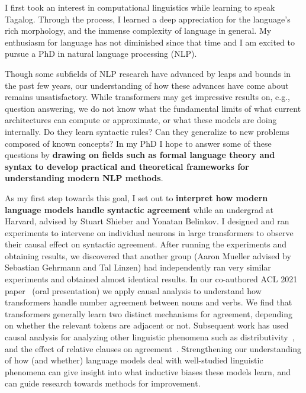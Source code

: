 \documentclass[12pt]{article}
\begin{document}
I first took an interest in computational linguistics 
while learning to speak Tagalog. 
Through the process, I learned a deep appreciation for the language's rich morphology,
and the immense complexity of language in general.
My enthusiasm for language has not diminished since that time
and I am excited to pursue a PhD in natural language processing (NLP).

Though some subfields of NLP research 
have advanced by leaps and bounds in the past few years,
our understanding of how these advances 
have come about remains unsatisfactory.
While transformers may get impressive results on, e.g., question answering,
we do not know what the fundamental limits 
of what current architectures can compute or approximate,
or what these models are doing internally.
Do they learn syntactic rules? 
Can they generalize to new problems composed of known concepts?
In my PhD I hope to answer some of these questions
by \textbf{drawing on fields such as formal language theory and syntax
to develop practical and theoretical frameworks 
for understanding modern NLP methods}.

As my first step towards this goal, 
I set out to \textbf{interpret how modern language models handle syntactic agreement}
while an undergrad at Harvard, advised by Stuart Shieber and Yonatan Belinkov.
I designed and ran experiments
to intervene on individual neurons in large transformers 
to observe their causal effect on syntactic agreement.
After running the experiments and obtaining results,
we discovered that another group 
(Aaron Mueller advised by Sebastian Gehrmann and Tal Linzen)
had independently ran very similar experiments and obtained almost identical results.
In our co-authored ACL 2021 paper~\cite{Finlayson2021CausalAO}
(oral presentation)
we apply causal analysis to understand 
how transformers handle number agreement between nouns and verbs. 
We find that transformers generally learn two distinct mechanisms
for agreement, depending on whether the relevant tokens are adjacent or not.
Subsequent work has used causal analysis 
for analyzing other linguistic phenomena 
such as distributivity~\cite{Ban2022TestingPL},
and the effect of relative clauses on agreement~\cite{Ravfogel2021CounterfactualIR}.
Strengthening our understanding of how 
(and whether) 
language models deal with well-studied linguistic phenomena
can give insight into what inductive biases these models learn, 
and can guide research towards methods for improvement.
\end{document}
